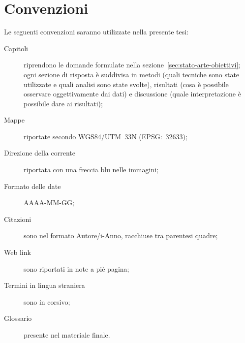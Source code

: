 \section{Convenzioni}
Le seguenti convenzioni saranno utilizzate nella presente tesi:
\begin{description}
	\item[Capitoli] riprendono le domande formulate nella sezione~\ref{sec:stato-arte-obiettivi}; ogni sezione di risposta è suddivisa in metodi (quali tecniche sono state utilizzate e quali analisi sono state svolte), risultati (cosa è possibile osservare oggettivamente dai dati) e discussione (quale interpretazione è possibile dare ai risultati);
	\item[Mappe] riportate secondo WGS84/UTM~33N (EPSG:~32633);
	\item[Direzione della corrente] riportata con una freccia blu nelle immagini;
	\item[Formato delle date] AAAA-MM-GG;
	\item[Citazioni] sono nel formato Autore/i-Anno, racchiuse tra parentesi quadre;
	\item[Web link] sono riportati in note a piè pagina;
	\item[Termini in lingua straniera] sono in corsivo;
	\item[Glossario] presente nel materiale finale.
\end{description}

